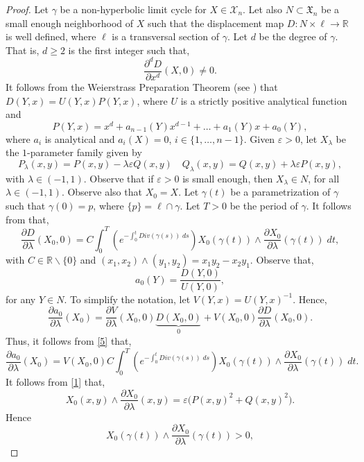 \documentclass[11pt]{amsart}
\begin{document}
\begin{proof} Let $\gamma$ be a non-hyperbolic limit cycle for $X\in\mathcal{X}_n$. Let also $N\subset\mathfrak{X}_n$ be a small enough neighborhood of $X$ such that the displacement map $D\colon N\times\ell\to\mathbb{R}$ is well defined, where $\ell$ is a transversal section of $\gamma$. Let $d$ be the degree of $\gamma$. That is, $d\geqslant2$ is the first integer such that,
	\[\frac{\partial^d D}{\partial x^d}(X,0)\neq0.\]
It follows from the Weierstrass Preparation Theorem (see \cite[Chapter $4$]{GolGui1973}) that $D(Y,x)=U(Y,x)P(Y,x)$, where $U$ is a strictly positive analytical function and
	\[P(Y,x)=x^d+a_{n-1}(Y)x^{d-1}+\dots+a_1(Y)x+a_0(Y),\]
where $a_i$ is analytical and $a_i(X)=0$, $i\in\{1,\dots,n-1\}$. Given $\varepsilon>0$, let $X_\lambda$ be the $1$-parameter family given by
\begin{equation}\label{1}
	P_\lambda(x,y)=P(x,y)-\lambda\varepsilon Q(x,y) \quad Q_\lambda(x,y)=Q(x,y)+\lambda\varepsilon P(x,y),
\end{equation}
with $\lambda\in(-1,1)$. Observe that if $\varepsilon>0$ is small enough, then $X_\lambda\in N$, for all $\lambda\in(-1,1)$. Observe also that $X_0=X$. Let $\gamma(t)$ be a parametrization of $\gamma$ such that $\gamma(0)=p$, where $\{p\}=\ell\cap\gamma$. Let $T>0$ be the period of $\gamma$. It follows from \cite[Lemma $2$]{Perko1992} that,
\begin{equation}\label{5}
	\frac{\partial D}{\partial\lambda}(X_0,0)=C\int_{0}^{T}\left(e^{-\int_{0}^{t}Div(\gamma(s))\;ds}\right)X_0(\gamma(t))\land\dfrac{\partial X_0}{\partial \lambda}(\gamma(t))\;dt,
\end{equation}
with $C\in\mathbb{R}\backslash\{0\}$ and $(x_1,x_2)\land(y_1,y_2)=x_1y_2-x_2y_1$. Observe that, 
	\[a_0(Y)=\frac{D(Y,0)}{U(Y,0)},\]
for any $Y\in N$. To simplify the notation, let $V(Y,x)=U(Y,x)^{-1}$. Hence,
	\[\frac{\partial a_0}{\partial\lambda}(X_0)=\frac{\partial V}{\partial\lambda}(X_0,0)\underbrace{D(X_0,0)}_{0}+V(X_0,0)\frac{\partial D}{\partial\lambda}(X_0,0).\]
Thus, it follows from \eqref{5} that,
\begin{equation}\label{3}
	\frac{\partial a_0}{\partial\lambda}(X_0)=V(X_0,0)C\int_{0}^{T}\left(e^{-\int_{0}^{t}Div(\gamma(s))\;ds}\right)X_0(\gamma(t))\land\dfrac{\partial X_0}{\partial \lambda}(\gamma(t))\;dt.
\end{equation}
It follows from \eqref{1} that,
	\[X_0(x,y)\land\dfrac{\partial X_0}{\partial \lambda}(x,y)=\varepsilon\bigl(P(x,y)^2+Q(x,y)^2\bigr).\]
Hence
	\[X_0(\gamma(t))\land\dfrac{\partial X_0}{\partial \lambda}(\gamma(t))>0,\]

\end{proof}
\end{document}
